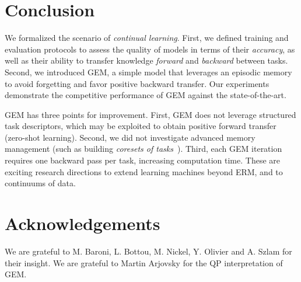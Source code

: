 \documentclass{article}
\begin{document}
\section{Conclusion}\label{sec:conclusion}
We formalized the scenario of \emph{continual learning}. First, we defined
training and evaluation protocols to assess the quality of models in terms of
their \emph{accuracy}, as well as their ability to transfer knowledge {\em
forward} and {\em backward} between tasks.  Second, we introduced GEM, a simple
model that leverages an episodic memory to avoid forgetting and favor positive
backward transfer. Our experiments demonstrate the competitive performance of
GEM against the state-of-the-art.

GEM has three points for improvement. First, GEM does not leverage structured
task descriptors, which may be exploited to obtain positive forward transfer
(zero-shot learning). Second, we did not investigate advanced memory management
(such as building \emph{coresets of tasks}~\citep{coresetMoG}). Third, each GEM
iteration requires one backward pass per task, increasing computation time.
These are exciting research directions to extend learning machines beyond ERM,
and to continuums of data.

\clearpage
\newpage

\section*{Acknowledgements}
We are grateful to M. Baroni, L. Bottou, M. Nickel, Y. Olivier and A. Szlam for
their insight. We are grateful to Martin Arjovsky for the QP interpretation of
GEM.


{
    \small
    
}

\clearpage
\newpage
\appendix

\end{document}
